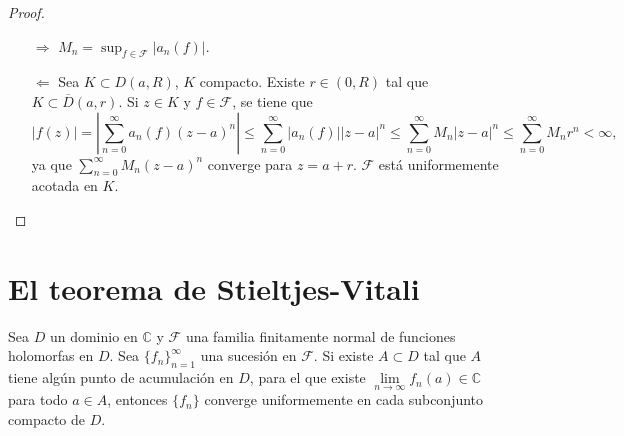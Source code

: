 \begin{proof}
    \hfill
    \begin{itemize}
        \item[$\boxed{\Rightarrow}$] $M_n = \sup_{f \in \mathcal{F}} |a_n(f)|$.
        \item[$\boxed{\Leftarrow}$] Sea $K \subset D(a, R)$, $K$ compacto.
              Existe $r \in (0, R)$ tal que $K \subset \overline{D}(a, r)$.
              Si $z \in K$ y $f \in \mathcal{F}$, se tiene que
              $$|f(z)| = \left|\sum_{n=0}^\infty a_n(f)(z-a)^n\right| \leq \sum_{n=0}^\infty |a_n(f)||z-a|^n \leq \sum_{n=0}^\infty M_n|z-a|^n \leq \sum_{n=0}^\infty M_nr^n < \infty,$$
              ya que $\sum_{n=0}^\infty M_n(z-a)^n$ converge para $z = a+r$.
              $\mathcal{F}$ está uniformemente acotada en $K$.
    \end{itemize}
\end{proof}

\section{El teorema de Stieltjes-Vitali}
\begin{theorem}
    Sea $D$ un dominio en $\mathbb{C}$ y $\mathcal{F}$ una familia finitamente normal de funciones holomorfas en $D$.
    Sea $\{f_n\}_{n=1}^\infty$ una sucesión en $\mathcal{F}$.
    Si existe $A \subset D$ tal que $A$ tiene algún punto de acumulación en $D$, para el que existe $\lim\limits_{n \to \infty} f_n(a) \in \mathbb{C}$ para todo $a \in A$, entonces $\{f_n\}$ converge uniformemente en cada subconjunto compacto de $D$.
\end{theorem}

